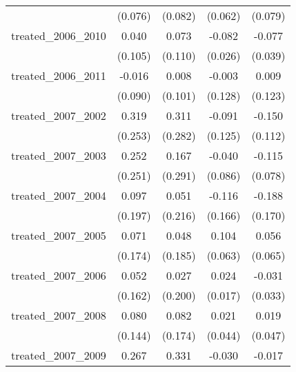 {\begin{tabular}{l*{4}{c}}
            &     (0.076)         &     (0.082)         &     (0.062)         &     (0.079)         \\
[1em]
treated\_2006\_2010&       0.040         &       0.073         &      -0.082\sym{**} &      -0.077\sym{*}  \\
            &     (0.105)         &     (0.110)         &     (0.026)         &     (0.039)         \\
[1em]
treated\_2006\_2011&      -0.016         &       0.008         &      -0.003         &       0.009         \\
            &     (0.090)         &     (0.101)         &     (0.128)         &     (0.123)         \\
[1em]
treated\_2007\_2002&       0.319         &       0.311         &      -0.091         &      -0.150         \\
            &     (0.253)         &     (0.282)         &     (0.125)         &     (0.112)         \\
[1em]
treated\_2007\_2003&       0.252         &       0.167         &      -0.040         &      -0.115         \\
            &     (0.251)         &     (0.291)         &     (0.086)         &     (0.078)         \\
[1em]
treated\_2007\_2004&       0.097         &       0.051         &      -0.116         &      -0.188         \\
            &     (0.197)         &     (0.216)         &     (0.166)         &     (0.170)         \\
[1em]
treated\_2007\_2005&       0.071         &       0.048         &       0.104         &       0.056         \\
            &     (0.174)         &     (0.185)         &     (0.063)         &     (0.065)         \\
[1em]
treated\_2007\_2006&       0.052         &       0.027         &       0.024         &      -0.031         \\
            &     (0.162)         &     (0.200)         &     (0.017)         &     (0.033)         \\
[1em]
treated\_2007\_2008&       0.080         &       0.082         &       0.021         &       0.019         \\
            &     (0.144)         &     (0.174)         &     (0.044)         &     (0.047)         \\
[1em]
treated\_2007\_2009&       0.267         &       0.331         &      -0.030         &      -0.017         \\

\end{tabular}}
